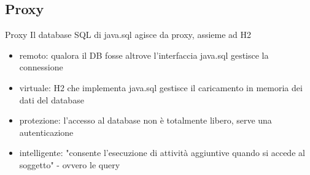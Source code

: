 \documentclass{beamer}
\begin{document}


\subsection{Proxy}
\begin{frame}{Proxy}
\quad Il database SQL di java.sql agisce da proxy, assieme ad H2 \\
\begin{itemize}
\item remoto: qualora il DB fosse altrove l'interfaccia java.sql gestisce la connessione
\item virtuale: H2 che implementa java.sql gestisce il caricamento in memoria dei dati del database
\item protezione: l'accesso al database non è totalmente libero, serve una autenticazione
\item intelligente: "consente l’esecuzione di attività aggiuntive quando si accede al soggetto" - ovvero le query 
\end{itemize}
\end{frame}
\end{document}
